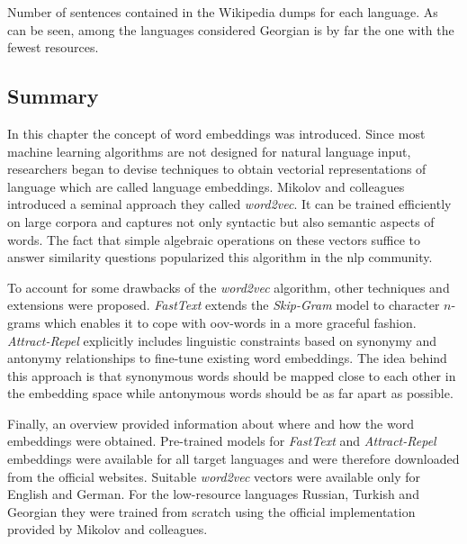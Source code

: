 \begin{table}[h]
	\centering
    	
  	\caption[Wikipedia statistics for each language]
		{Number of sentences contained in the Wikipedia dumps for each language. As can be seen, among the languages
 		considered Georgian is by far the one with the fewest resources.}
	\label{tab:wikipedia_stats}
\end{table}

\subsection{Summary}
\label{sec:word_embs_summary}

In this chapter the concept of word embeddings was introduced. Since most machine learning algorithms are not designed for natural language input, researchers began to devise techniques to obtain vectorial representations of language which are called language embeddings. Mikolov and colleagues introduced a seminal approach they called \textit{word2vec}. It can be trained efficiently on large corpora and captures not only syntactic but also semantic aspects of words. The fact that simple algebraic operations on these vectors suffice to answer similarity questions popularized this algorithm in the \gls{nlp} community.

To account for some drawbacks of the \textit{word2vec} algorithm, other techniques and extensions were proposed. \textit{FastText} extends the \textit{Skip-Gram} model to character $n$-grams which enables it to cope with \gls{oov}-words in a more graceful fashion. \textit{Attract-Repel} explicitly includes linguistic constraints based on synonymy and antonymy relationships to fine-tune existing word embeddings. The idea behind this approach is that synonymous words should be mapped close to each other in the embedding space while antonymous words should be as far apart as possible.

Finally, an overview provided information about where and how the word embeddings were obtained. Pre-trained models for \textit{FastText} and \textit{Attract-Repel} embeddings were available for all target languages and were therefore downloaded from the official websites. Suitable \textit{word2vec} vectors were available only for English and German. For the low-resource languages Russian, Turkish and Georgian they were trained from scratch using the official implementation provided by Mikolov and colleagues.